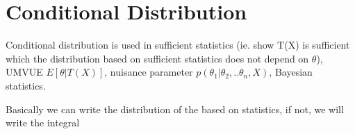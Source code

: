 \section{Conditional Distribution}

Conditional distribution is used in sufficient statistics (ie. show T(X) is sufficient which the distribution based on sufficient statistics does not depend on $\theta$), 
UMVUE $E[\theta | T(X)]$, nuisance parameter $p(\theta_1 | \theta_2,.. \theta_n, X)$, Bayesian statistics. 

Basically we can write the distribution of the based on statistics, if not, we will write the integral 


